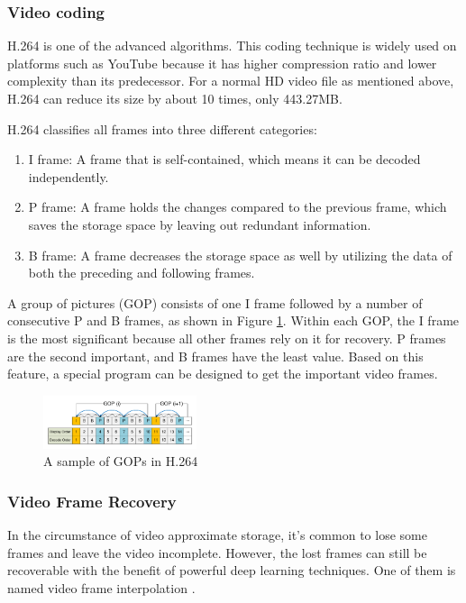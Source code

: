 \documentclass[sigconf]{acmart}
\begin{document}
\subsubsection{Video coding}
H.264 \cite{wiegand2003overview} is one of the advanced algorithms. This coding technique is widely used on platforms such as YouTube because it has higher compression ratio and lower complexity than its predecessor. For a normal HD video file as mentioned above, H.264 can reduce its size by about 10 times, only 443.27MB.

H.264 classifies all frames into three different categories:
\begin{enumerate}
    \item I frame: A frame that is self-contained, which means it can be decoded independently.
    \item P frame: A frame holds the changes compared to the previous frame, which saves the storage space by leaving out redundant information.
    \item B frame: A frame decreases the storage space as well by utilizing the data of both the preceding and following frames.
\end{enumerate}
A group of pictures (GOP) consists of one I frame followed by a number of consecutive P and B frames, as shown in Figure \ref{H264-IPB}.
Within each GOP, the I frame is the most significant because all other frames rely on it for recovery. P frames are the second important, and B frames have the least value.
Based on this feature, a special program can be designed to get the important video frames.

\begin{figure}[ht]
\centering
\includegraphics[width=0.4\textwidth]{photo/H264_IPB.pdf}
\caption{A sample of GOPs in H.264}
\label{H264-IPB}
\end{figure}

\subsubsection{Video Frame Recovery}
In the circumstance of video approximate storage, it's common to lose some frames and leave the video incomplete. However, the lost frames can still be recoverable with the benefit of powerful deep learning techniques. One of them is named video frame interpolation \cite{meyer2015phase, niklaus2018context, van2017frame}.
\end{document}
